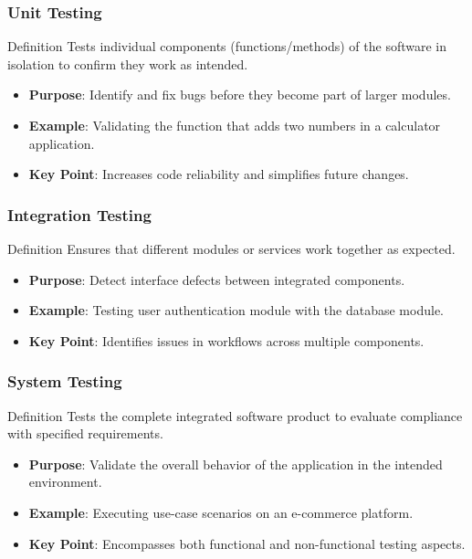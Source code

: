 \documentclass{beamer}
\begin{document}
\begin{frame}[fragile]
    \frametitle{Unit Testing}
    \begin{block}{Definition}
        Tests individual components (functions/methods) of the software in isolation to confirm they work as intended.
    \end{block}
    \begin{itemize}
        \item \textbf{Purpose}: Identify and fix bugs before they become part of larger modules.
        \item \textbf{Example}: Validating the function that adds two numbers in a calculator application.
        \item \textbf{Key Point}: Increases code reliability and simplifies future changes.
    \end{itemize}
\end{frame}

\begin{frame}[fragile]
    \frametitle{Integration Testing}
    \begin{block}{Definition}
        Ensures that different modules or services work together as expected.
    \end{block}
    \begin{itemize}
        \item \textbf{Purpose}: Detect interface defects between integrated components.
        \item \textbf{Example}: Testing user authentication module with the database module.
        \item \textbf{Key Point}: Identifies issues in workflows across multiple components.
    \end{itemize}
\end{frame}

\begin{frame}[fragile]
    \frametitle{System Testing}
    \begin{block}{Definition}
        Tests the complete integrated software product to evaluate compliance with specified requirements.
    \end{block}
    \begin{itemize}
        \item \textbf{Purpose}: Validate the overall behavior of the application in the intended environment.
        \item \textbf{Example}: Executing use-case scenarios on an e-commerce platform.
        \item \textbf{Key Point}: Encompasses both functional and non-functional testing aspects.
    \end{itemize}
\end{frame}
\end{document}

